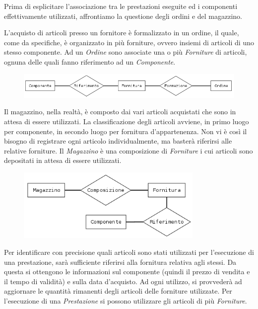 		Prima di esplicitare l'associazione tra le prestazioni eseguite ed i componenti effettivamente utilizzati, affrontiamo la questione degli ordini e del magazzino.
		
		L'acquisto di articoli presso un fornitore è formalizzato in un ordine, il quale, come da specifiche, è organizzato in più forniture, ovvero insiemi di articoli di uno stesso componente.
		Ad un \emph{Ordine} sono associate una o più \emph{Forniture} di articoli, ognuna delle quali fanno riferimento ad un \emph{Componente}.
		
		\begin{figure}[H]
			\centering
			\includegraphics[width=11.5cm]{images/diagrams/componente_ordine.png}
		\end{figure}
		
		Il magazzino, nella realtà, è composto dai vari articoli acquistati che sono in attesa di essere utilizzati. La classificazione degli articoli avviene, in primo luogo per componente, in secondo luogo per fornitura d'appartenenza. Non vi è così il bisogno di registrare ogni articolo individualmente, ma basterà riferirsi alle relative forniture.
		Il \emph{Magazzino} è una composizione di \emph{Forniture} i cui articoli sono depositati in attesa di essere utilizzati.
		
		\begin{figure}[H]
			\centering
			\includegraphics[width=9cm]{images/diagrams/magazzino_fornitura.png}
		\end{figure}
		
		Per identificare con precisione quali articoli sono stati utilizzati per l'esecuzione di una prestazione, sarà sufficiente riferirsi alla fornitura relativa agli stessi. Da questa si ottengono le informazioni sul componente (quindi il prezzo di vendita e il tempo di validità) e sulla data d'acquisto.
		Ad ogni utilizzo, si provvederà ad aggiornare le quantità rimanenti degli articoli delle forniture utilizzate.
		Per l'esecuzione di una \emph{Prestazione} si possono utilizzare gli articoli di più \emph{Forniture}.
		
